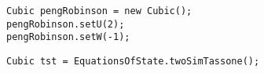 \begin{lstlisting}[label=pengRobinsonCreation,caption=Creación de la ecuación de estado de Peng Robinson usando los metodos Set de los parametros u y w]
Cubic pengRobinson = new Cubic();
pengRobinson.setU(2);
pengRobinson.setW(-1);
\end{lstlisting}

\begin{lstlisting}[label=tstCreation,caption=Creación de la ecuación de estado de TST usando la clase EquationsOfState]
Cubic tst = EquationsOfState.twoSimTassone();
\end{lstlisting}












